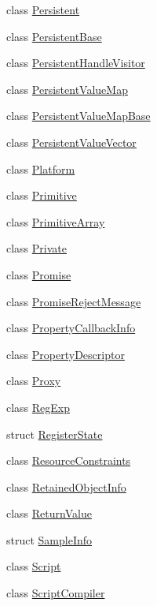 \begin{DoxyCompactItemize}
class \mbox{\hyperlink{classv8_1_1Persistent}{Persistent}}
\item 
class \mbox{\hyperlink{classv8_1_1PersistentBase}{Persistent\+Base}}
\item 
class \mbox{\hyperlink{classv8_1_1PersistentHandleVisitor}{Persistent\+Handle\+Visitor}}
\item 
class \mbox{\hyperlink{classv8_1_1PersistentValueMap}{Persistent\+Value\+Map}}
\item 
class \mbox{\hyperlink{classv8_1_1PersistentValueMapBase}{Persistent\+Value\+Map\+Base}}
\item 
class \mbox{\hyperlink{classv8_1_1PersistentValueVector}{Persistent\+Value\+Vector}}
\item 
class \mbox{\hyperlink{classv8_1_1Platform}{Platform}}
\item 
class \mbox{\hyperlink{classv8_1_1Primitive}{Primitive}}
\item 
class \mbox{\hyperlink{classv8_1_1PrimitiveArray}{Primitive\+Array}}
\item 
class \mbox{\hyperlink{classv8_1_1Private}{Private}}
\item 
class \mbox{\hyperlink{classv8_1_1Promise}{Promise}}
\item 
class \mbox{\hyperlink{classv8_1_1PromiseRejectMessage}{Promise\+Reject\+Message}}
\item 
class \mbox{\hyperlink{classv8_1_1PropertyCallbackInfo}{Property\+Callback\+Info}}
\item 
class \mbox{\hyperlink{classv8_1_1PropertyDescriptor}{Property\+Descriptor}}
\item 
class \mbox{\hyperlink{classv8_1_1Proxy}{Proxy}}
\item 
class \mbox{\hyperlink{classv8_1_1RegExp}{Reg\+Exp}}
\item 
struct \mbox{\hyperlink{structv8_1_1RegisterState}{Register\+State}}
\item 
class \mbox{\hyperlink{classv8_1_1ResourceConstraints}{Resource\+Constraints}}
\item 
class \mbox{\hyperlink{classv8_1_1RetainedObjectInfo}{Retained\+Object\+Info}}
\item 
class \mbox{\hyperlink{classv8_1_1ReturnValue}{Return\+Value}}
\item 
struct \mbox{\hyperlink{structv8_1_1SampleInfo}{Sample\+Info}}
\item 
class \mbox{\hyperlink{classv8_1_1Script}{Script}}
\item 
class \mbox{\hyperlink{classv8_1_1ScriptCompiler}{Script\+Compiler}}

\end{DoxyCompactItemize}
